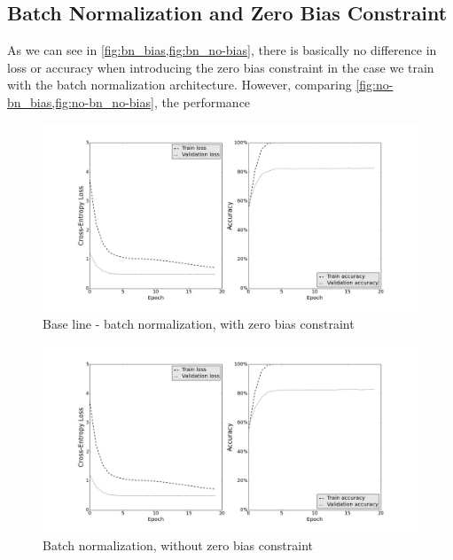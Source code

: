 \documentclass[a4paper, 11pt]{article}
\begin{document}
\subsection{Batch Normalization and Zero Bias Constraint}

As we can see in \cref{fig:bn_bias,fig:bn_no-bias}, there is basically no difference in loss or accuracy when introducing the zero bias constraint in the case we train with the batch normalization architecture.
However, comparing \cref{fig:no-bn_bias,fig:no-bn_no-bias}, the performance


\begin{figure}[H]
	\includegraphics[width=\linewidth]{bn_bias-constraint.png}
	\caption{Base line - batch normalization, with zero bias constraint}
	\label{fig:bn_bias}
\end{figure}

\begin{figure}[H]
	\includegraphics[width=\linewidth]{bn_no-bias-constraint.png}
	\caption{Batch normalization, without zero bias constraint}
	\label{fig:bn_no-bias}
\end{figure}
\end{document}
